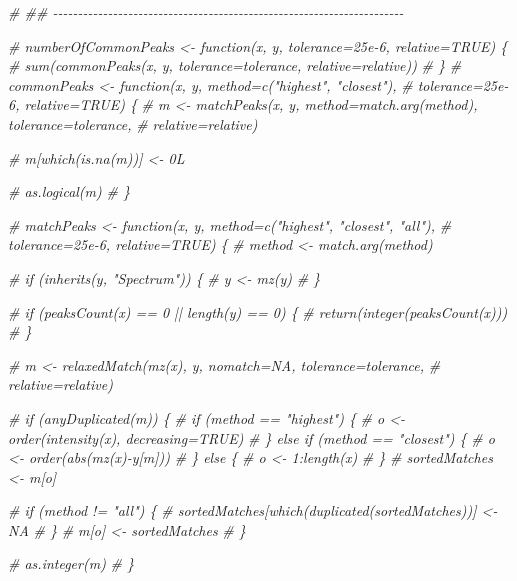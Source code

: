 \documentclass[
]{article}
\newenvironment{Shaded}{\begin{snugshade}}{\end{snugshade}}
\newcommand{\CommentTok}[1]{\textcolor[rgb]{0.56,0.35,0.01}{\textit{#1}}}
\begin{document}
\begin{Shaded}
\begin{Highlighting}[]
\CommentTok{\# \#\# {-}{-}{-}{-}{-}{-}{-}{-}{-}{-}{-}{-}{-}{-}{-}{-}{-}{-}{-}{-}{-}{-}{-}{-}{-}{-}{-}{-}{-}{-}{-}{-}{-}{-}{-}{-}{-}{-}{-}{-}{-}{-}{-}{-}{-}{-}{-}{-}{-}{-}{-}{-}{-}{-}{-}{-}{-}{-}{-}{-}{-}{-}{-}{-}{-}{-}{-}{-}{-}{-} }

\CommentTok{\# numberOfCommonPeaks \textless{}{-} function(x, y, tolerance=25e{-}6, relative=TRUE) \{}
\CommentTok{\#   sum(commonPeaks(x, y, tolerance=tolerance, relative=relative))}
\CommentTok{\# \}}
\CommentTok{\# commonPeaks \textless{}{-} function(x, y, method=c("highest", "closest"),}
\CommentTok{\#                          tolerance=25e{-}6, relative=TRUE) \{}
\CommentTok{\#   m \textless{}{-} matchPeaks(x, y, method=match.arg(method), tolerance=tolerance,}
\CommentTok{\#                   relative=relative)}

\CommentTok{\#   m[which(is.na(m))] \textless{}{-} 0L}

\CommentTok{\#   as.logical(m)}
\CommentTok{\# \}}

\CommentTok{\# matchPeaks \textless{}{-} function(x, y, method=c("highest", "closest", "all"),}
\CommentTok{\#                        tolerance=25e{-}6, relative=TRUE) \{}
\CommentTok{\#   method \textless{}{-} match.arg(method)}

\CommentTok{\#   if (inherits(y, "Spectrum")) \{}
\CommentTok{\#     y \textless{}{-} mz(y)}
\CommentTok{\#   \}}

\CommentTok{\#   if (peaksCount(x) == 0 || length(y) == 0) \{}
\CommentTok{\#     return(integer(peaksCount(x)))}
\CommentTok{\#   \}}

\CommentTok{\#   m \textless{}{-} relaxedMatch(mz(x), y, nomatch=NA, tolerance=tolerance,}
\CommentTok{\#                     relative=relative)}

\CommentTok{\#   if (anyDuplicated(m)) \{}
\CommentTok{\#     if (method == "highest") \{}
\CommentTok{\#       o \textless{}{-} order(intensity(x), decreasing=TRUE)}
\CommentTok{\#     \} else if (method == "closest") \{}
\CommentTok{\#       o \textless{}{-} order(abs(mz(x){-}y[m]))}
\CommentTok{\#     \} else \{}
\CommentTok{\#       o \textless{}{-} 1:length(x)}
\CommentTok{\#     \}}
\CommentTok{\#     sortedMatches \textless{}{-} m[o]}

\CommentTok{\#     if (method != "all") \{}
\CommentTok{\#       sortedMatches[which(duplicated(sortedMatches))] \textless{}{-} NA}
\CommentTok{\#     \}}
\CommentTok{\#     m[o] \textless{}{-} sortedMatches}
\CommentTok{\#   \}}

\CommentTok{\#   as.integer(m)}
\CommentTok{\# \}}


\end{Highlighting}
\end{Shaded}
\end{document}

